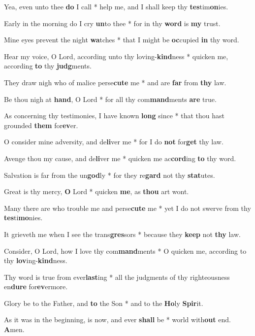 \begin{multicols}{2}
	Yea, even unto thee \textbf{do} I call * help me, and I shall keep thy \textbf{tes}tim\textbf{on}ies.
	
	Early in the morning do I cry \textbf{un}to thee * for in thy \textbf{word} is \textbf{my} trust.
	
	Mine eyes prevent the night \textbf{wa}tches * that I might be \textbf{oc}cupied \textbf{in} thy word.
	
	Hear my voice, O Lord, according unto thy loving-\textbf{kind}ness * quicken me, according \textbf{to} thy \textbf{judg}ments.
	
	They draw nigh who of malice perse\textbf{cute} me * and are \textbf{far} from \textbf{thy} law.
	
	Be thou nigh at \textbf{hand}, O Lord * for all thy com\textbf{mand}ments \textbf{are} true.
	
	As concerning thy testimonies, I have known \textbf{long} since * that thou hast grounded \textbf{them} for\textbf{ev}er.
	
	O consider mine adversity, and de\textbf{li}ver me * for I do \textbf{not} for\textbf{get} thy law.
	
	Avenge thou my cause, and de\textbf{li}ver me * quicken me ac\textbf{cord}ing \textbf{to} thy word.
	
	Salvation is far from the un\textbf{god}ly * for they re\textbf{gard} not thy \textbf{stat}utes.
	
	Great is thy mercy, \textbf{O} Lord * quicken \textbf{me}, as \textbf{thou} art wont.
	
	Many there are who trouble me and perse\textbf{cute} me * yet I do not swerve from thy \textbf{tes}ti\textbf{mo}nies.
	
	It grieveth me when I see the trans\textbf{gres}sors * because they \textbf{keep} not \textbf{thy} law.
	
	Consider, O Lord, how I love thy com\textbf{mand}ments * O quicken me, according to thy \textbf{lov}ing-\textbf{kind}ness.
	
	Thy word is true from ever\textbf{last}ing * all the judgments of thy righteousness en\textbf{dure} for\textbf{ev}ermore.
	
	Glory be to the Father, and \textbf{to} the Son * and to the \textbf{Ho}ly \textbf{Spir}it.
	
	As it was in the beginning, is now, and ever \textbf{shall} be * world with\textbf{out} end. \textbf{A}men.
\end{multicols}